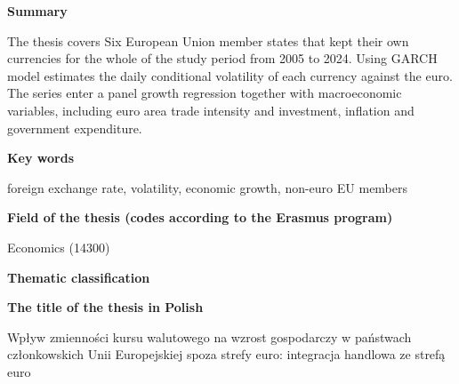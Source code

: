\providecommand{\signline}[1]{%
  \noindent\parbox[t]{0.45\textwidth}{Date}%
  \hfill
  \parbox[t]{0.5\textwidth}{\centering #1}\par}
 
\clearpage
\begingroup
\setlength{\parindent}{0pt}
\setlength{\parskip}{\baselineskip}
 

 
\begin{center}\textbf{Summary}\end{center}
 
\vspace{-0.5\baselineskip}
 
The thesis covers Six European Union member states that kept their own currencies for the whole of the study period from 2005 to 2024. 
Using GARCH model estimates the daily conditional volatility of each currency against the euro.
The series enter a panel growth regression together with macroeconomic variables, including euro area trade intensity and investment, inflation and government expenditure.

 
\vspace{2\baselineskip}
 
\begin{center}\textbf{Key  words}\end{center}
 
\begin{center}
foreign exchange rate, volatility, economic growth, non-euro EU members
\end{center}
 
\vspace{2\baselineskip}
 
\begin{center}\textbf{Field of the thesis (codes according to the Erasmus program)}\end{center}
 
\begin{center}Economics (14300)\end{center}
 
\vspace{2\baselineskip}
 
\begin{center}\textbf{Thematic classification}\end{center}
 

\vspace{2\baselineskip}
 
\begin{center}\textbf{The title of the thesis in Polish}\end{center}
 
\begin{center}Wpływ zmienności kursu walutowego na wzrost gospodarczy w państwach
członkowskich Unii Europejskiej spoza strefy euro: integracja handlowa ze strefą euro
\end{center}
    
    \endgroup
\clearpage